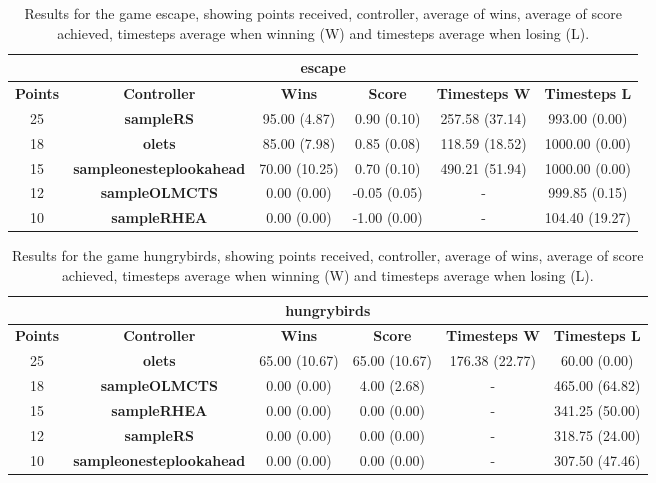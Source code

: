 \begin{table*}[!t]
\begin{center}
\begin{tabular}{|c|c|c|c|c|c|}
\multicolumn{6}{c}{\textbf{escape}}\\
\hline
\textbf{Points} & \textbf{Controller} & \textbf{Wins} &  \textbf{Score} & \textbf{Timesteps W} & \textbf{Timesteps L}\\
\hline
25 & \textbf{sampleRS} & 95.00 (4.87) & 0.90 (0.10) & 257.58 (37.14) & 993.00 (0.00)
 \\
\hline
18 & \textbf{olets} & 85.00 (7.98) & 0.85 (0.08) & 118.59 (18.52) & 1000.00 (0.00)
 \\
\hline
15 & \textbf{sampleonesteplookahead} & 70.00 (10.25) & 0.70 (0.10) & 490.21 (51.94) & 1000.00 (0.00)
 \\
\hline
12 & \textbf{sampleOLMCTS} & 0.00 (0.00) & -0.05 (0.05) &  -  & 999.85 (0.15)
 \\
\hline
10 & \textbf{sampleRHEA} & 0.00 (0.00) & -1.00 (0.00) &  -  & 104.40 (19.27)
 \\
\hline
\end{tabular}
\caption{Results for the game escape, showing points received, controller, average of wins, average of score achieved, timesteps average when winning (W) and timesteps average when losing (L).}
\label{tab:weights}
\end{center}
\end{table*}
\begin{table*}[!t]
\begin{center}
\begin{tabular}{|c|c|c|c|c|c|}
\multicolumn{6}{c}{\textbf{hungrybirds}}\\
\hline
\textbf{Points} & \textbf{Controller} & \textbf{Wins} &  \textbf{Score} & \textbf{Timesteps W} & \textbf{Timesteps L}\\
\hline
25 & \textbf{olets} & 65.00 (10.67) & 65.00 (10.67) & 176.38 (22.77) & 60.00 (0.00)
 \\
\hline
18 & \textbf{sampleOLMCTS} & 0.00 (0.00) & 4.00 (2.68) &  -  & 465.00 (64.82)
 \\
\hline
15 & \textbf{sampleRHEA} & 0.00 (0.00) & 0.00 (0.00) &  -  & 341.25 (50.00)
 \\
\hline
12 & \textbf{sampleRS} & 0.00 (0.00) & 0.00 (0.00) &  -  & 318.75 (24.00)
 \\
\hline
10 & \textbf{sampleonesteplookahead} & 0.00 (0.00) & 0.00 (0.00) &  -  & 307.50 (47.46)
 \\
\hline
\end{tabular}
\caption{Results for the game hungrybirds, showing points received, controller, average of wins, average of score achieved, timesteps average when winning (W) and timesteps average when losing (L).}
\label{tab:weights}
\end{center}
\end{table*}
